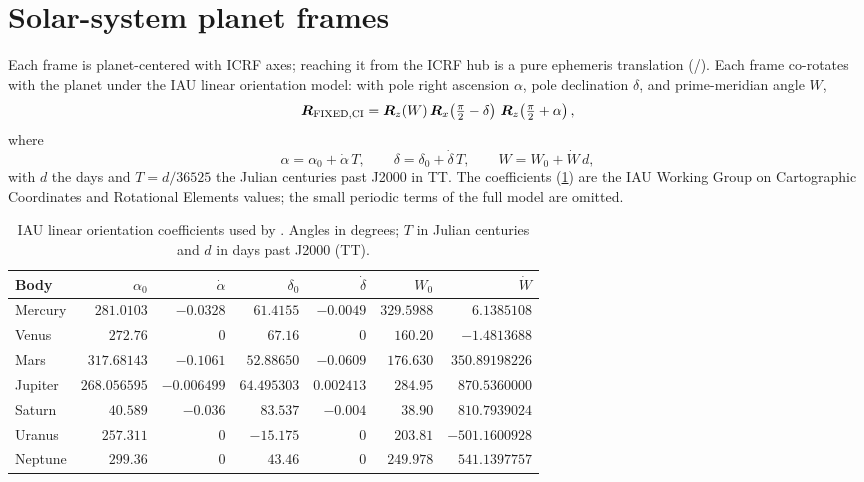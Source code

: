 \section{Solar-system planet frames}
\label{sec:fc-planets}

Each  frame is planet-centered with ICRF axes; reaching it
from the ICRF hub is a pure ephemeris translation
(/). Each 
frame co-rotates with the planet under the IAU linear orientation model:
with pole right ascension $\alpha$, pole declination $\delta$, and
prime-meridian angle $W$,
%
\begin{equation}
  \label{eq:fc-iau}
  \bm{R}_{\mathrm{FIXED},\mathrm{CI}}
  = \bm{R}_z(W)\,
    \bm{R}_x\!\left(\tfrac{\pi}{2}-\delta\right)\,
    \bm{R}_z\!\left(\tfrac{\pi}{2}+\alpha\right),
\end{equation}
%
where
%
\begin{equation}
  \label{eq:fc-iau-elements}
  \alpha = \alpha_0 + \dot{\alpha}\,T, \qquad
  \delta = \delta_0 + \dot{\delta}\,T, \qquad
  W = W_0 + \dot{W}\,d,
\end{equation}
%
with $d$ the days and $T = d/36525$ the Julian centuries past J2000 in TT.
The coefficients (\cref{tab:fc-iau}) are the IAU Working Group on
Cartographic Coordinates and Rotational Elements values; the small periodic
terms of the full model are omitted.

\begin{table}[H]
  \centering
  \caption{IAU linear orientation coefficients used by
    . Angles in degrees; $T$ in Julian centuries and
    $d$ in days past J2000 (TT).}
  \label{tab:fc-iau}
  \begin{tabular}{l r r r r r r}
    \toprule
    Body & $\alpha_0$ & $\dot{\alpha}$ & $\delta_0$ & $\dot{\delta}$ & $W_0$ & $\dot{W}$ \\
    \midrule
    Mercury & $281.0103$  & $-0.0328$   & $61.4155$  & $-0.0049$ & $329.5988$ & $6.1385108$    \\
    Venus   & $272.76$    & $0$         & $67.16$    & $0$       & $160.20$   & $-1.4813688$   \\
    Mars    & $317.68143$ & $-0.1061$   & $52.88650$ & $-0.0609$ & $176.630$  & $350.89198226$ \\
    Jupiter & $268.056595$& $-0.006499$ & $64.495303$& $0.002413$& $284.95$   & $870.5360000$  \\
    Saturn  & $40.589$    & $-0.036$    & $83.537$   & $-0.004$  & $38.90$    & $810.7939024$  \\
    Uranus  & $257.311$   & $0$         & $-15.175$  & $0$       & $203.81$   & $-501.1600928$ \\
    Neptune & $299.36$    & $0$         & $43.46$    & $0$       & $249.978$  & $541.1397757$  \\
    \bottomrule
  \end{tabular}
\end{table}

